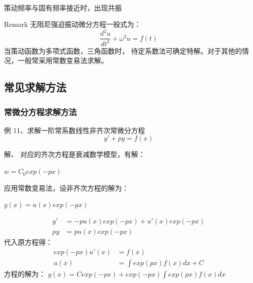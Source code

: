 \begin{frame}
	 \\
	策动频率与固有频率接近时，出现共振
\end{frame}

\begin{frame}
	\begin{block} {Remark}
	无阻尼强迫振动微分方程一般式为：
	\begin{equation*}
		\frac{d^2 u}{d t^2} + \omega ^2 u = f(t)
	\end{equation*}
	当策动函数为多项式函数，三角函数时， 待定系数法可确定特解。对于其他的情况，一般常采用常数变易法求解。
	\end{block}
\end{frame}

\subsection{常见求解方法}

\begin{frame}
\frametitle{常微分方程求解方法}
	\begin{exampleblock} {例 11、求解一阶常系数线性非齐次常微分方程}
	\begin{equation*}
		y'+py=f(x)
	\end{equation*}
	\end{exampleblock}
	\alert{解、} 对应的齐次方程是衰减数学模型，有解：\\
	\begin{center}
		$w=C_0 exp(-px)$
	\end{center} 
	应用常数变易法，设非齐次方程的解为：\\
	\begin{center}
		$y(x) =u(x) exp(-px)$
	\end{center} 
\end{frame}

\begin{frame}
	\begin{align*}
		y'&= -p u(x) exp(-px) + u'(x) exp(-px)   \\
		py&= p u(x) exp(-px)
	\end{align*}	
	代入原方程得：
	\begin{align*}
		exp(-px)u'(x)&= f(x)\\
		u(x) &= \int exp(px) f (x)dx + C
	\end{align*}
	方程的解为： $ y(x)=C exp(-px)+exp(-px) \int exp(px)f(x)dx $ \\
\end{frame}

